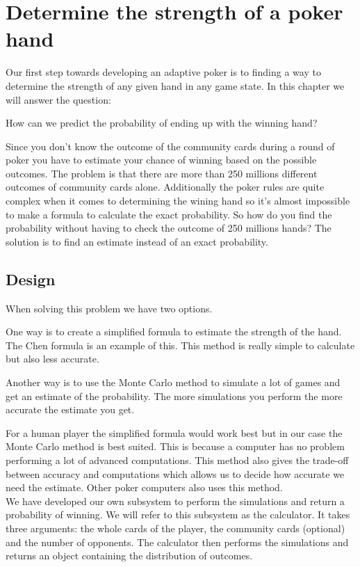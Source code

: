 \section{Determine the strength of a poker hand}
Our first step towards developing an adaptive poker is to finding a way to determine the strength of any given hand in any game state. In this chapter we will answer the question: 

\begin{center}
How can we predict the probability of ending up with the winning hand?
\end{center}

Since you don't know the outcome of the community cards during a round of poker you have to estimate your chance of winning based on the possible outcomes. The problem is that there are more than 250 millions different outcomes of community cards alone. Additionally the poker rules are quite complex when it comes to determining the wining hand so it's almost impossible to make a formula to calculate the exact probability. So how do you find the probability without having to check the outcome of 250 millions hands? 
The solution is to find an estimate instead of an exact probability.

\subsection{Design}
When solving this problem we have two options.

One way is to create a simplified formula to estimate the strength of the hand. The Chen formula is an example of this. This method is really simple to calculate but also less accurate.

Another way is to use the Monte Carlo method to simulate a lot of games and get an estimate of the probability. The more simulations you perform the more accurate the estimate you get.

For a human player the simplified formula would work best but in our case the Monte Carlo method is best suited. This is because a computer has no problem performing a lot of advanced computations. This method also gives the trade-off between accuracy and computations which allows us to decide how accurate we need the estimate. Other poker computers also uses this method.\\

We have developed our own subsystem to perform the simulations and return a probability of winning. We will refer to this subsystem as the calculator. It takes three arguments: the whole cards of the player, the community cards (optional) and the number of opponents. The calculator then performs the simulations and returns an object containing the distribution of outcomes.

